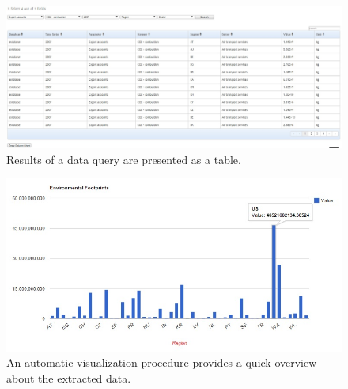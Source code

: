 \documentclass[12pt,letterpaper]{report}
\begin{document}
\begin{figure}[h!]
\centering
\includegraphics[width=1.0\columnwidth]{figures/web6/web6.jpg}
\label{fig:table} Results of a data query are presented as a table.
\end{figure}


\begin{figure}[h!]
\centering
\includegraphics[width=1.0\columnwidth]{figures/web7/web7.jpg}
\label{fig:bar} An automatic visualization procedure provides a quick overview about the extracted data.
\end{figure}







\end{document}
